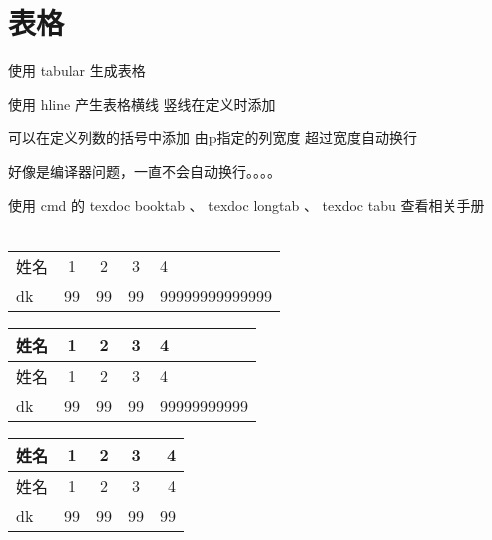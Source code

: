 \documentclass[UTF8]{article}
\date{\today}
\begin{document}
	\section{表格}
	使用  tabular 生成表格
	
	使用 hline 产生表格横线  竖线在定义时添加
	
	可以在定义列数的括号中添加 由p指定的列宽度  超过宽度自动换行
	
	好像是编译器问题，一直不会自动换行。。。。
	
	使用   cmd  的 texdoc booktab 、 texdoc longtab 、 texdoc tabu 查看相关手册
\\
\\
\begin{center}
	\begin{tabular}{l c c c |p{1.5cm}|}%
		姓名 &1 &2 &3 &4\\
		dk   &99 &99 &99 &99999999999999\\
	\end{tabular}

	\begin{tabular}{l |c |c |c |p{0.5cm}|}%
		姓名 &1 &2 &3 &4\\
		\hline
		姓名 &1 &2 &3 &4\\
		\hline
		dk   &99 &99 &99 &99999999999\\
	\end{tabular}

	\begin{tabular}{|l| c| c| c| r|}%
		\hline
		姓名 &1 &2 &3 &4\\
		\hline
		姓名 &1 &2 &3 &4\\
		\hline
		dk   &99 &99 &99 &99\\
		\hline
	\end{tabular}
\end{center}
\end{document}
